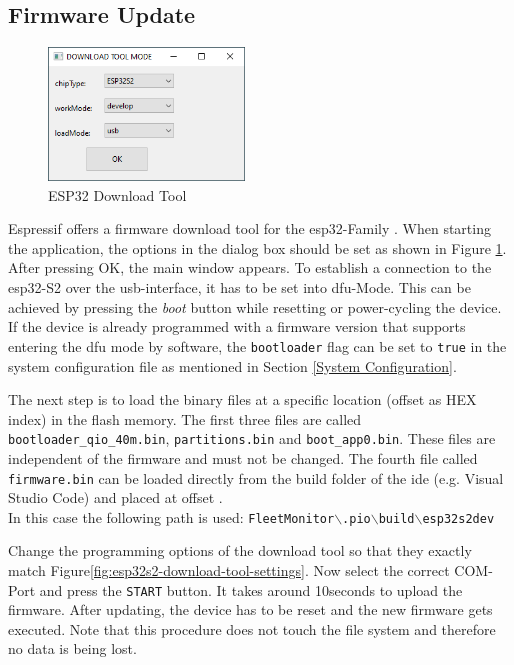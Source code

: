\subsection{Firmware Update} \label{Firmware Update}
\begin{figure}
\vspace{-0.6cm}
\includegraphics[width=5.2cm]{images/ESP32_Download_Mode}
\vspace{-0.4cm}
\caption{ESP32 Download Tool}
\label{fig:esp32-download-tool}
\end{figure} 
Espressif offers a firmware download tool for the \gls{esp32}-Family \cite{flash-download-tools}. When starting the application, the options in the dialog box should be set as shown in Figure \ref{fig:esp32-download-tool}. After pressing OK, the main window appears. 
To establish a connection to the \gls{esp32}-S2 over the \acrshort{usb}-interface, it has to be set into \acrshort{dfu}-Mode. This can be achieved by pressing the \textit{boot} button while resetting or power-cycling the device. If the device is already programmed with a firmware version that supports entering the \acrshort{dfu} mode by software, the \texttt{bootloader} flag can be set to \texttt{true} in the system configuration file as mentioned in Section \ref{System Configuration}.

The next step is to load the binary files at a specific location (offset as HEX index) in the flash memory. The first three files are called \texttt{bootloader\_qio\_40m.bin}, \texttt{partitions.bin} and \texttt{boot\_app0.bin}. These files are independent of the firmware and must not be changed. The fourth file called \texttt{firmware.bin} can be loaded directly from the build folder of the \acrshort{ide} (e.g. Visual Studio Code) and placed at offset . \\
In this case the following path is used: \texttt{FleetMonitor$\backslash$.pio$\backslash$build$\backslash$esp32s2dev}

Change the programming options of the download tool so that they exactly match Figure\;\ref{fig:esp32s2-download-tool-settings}. Now select the correct COM-Port and press the \texttt{START} button. It takes around 10\;seconds to upload the firmware. After updating, the device has to be reset and the new firmware gets executed. Note that this procedure does not touch the file system and therefore no data is being lost.

